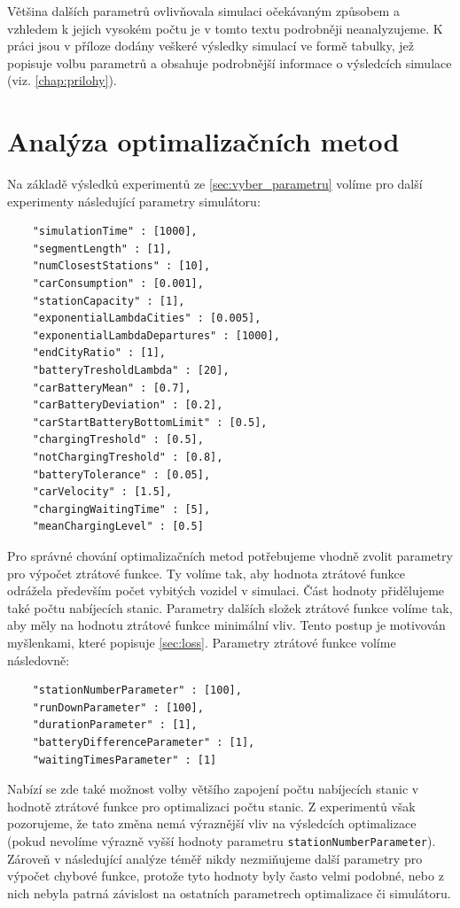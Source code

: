 Většina dalších parametrů ovlivňovala simulaci očekávaným způsobem a vzhledem k jejich vysokém
počtu je v tomto textu podrobněji neanalyzujeme. K práci jsou v příloze dodány veškeré výsledky
simulací ve formě tabulky, jež popisuje volbu parametrů a obsahuje podrobnější informace
o výsledcích simulace (viz. \cref{chap:prilohy}).


\section{Analýza optimalizačních metod}

Na základě výsledků experimentů ze \cref{sec:vyber_parametru} volíme pro další experimenty
následující parametry simulátoru:

\begin{verbatim}
    "simulationTime" : [1000],
    "segmentLength" : [1],
    "numClosestStations" : [10],
    "carConsumption" : [0.001],
    "stationCapacity" : [1],
    "exponentialLambdaCities" : [0.005],
    "exponentialLambdaDepartures" : [1000],
    "endCityRatio" : [1],
    "batteryTresholdLambda" : [20],
    "carBatteryMean" : [0.7],
    "carBatteryDeviation" : [0.2],
    "carStartBatteryBottomLimit" : [0.5],
    "chargingTreshold" : [0.5],
    "notChargingTreshold" : [0.8],
    "batteryTolerance" : [0.05],
    "carVelocity" : [1.5],
    "chargingWaitingTime" : [5],
    "meanChargingLevel" : [0.5]
\end{verbatim}

Pro správné chování optimalizačních metod potřebujeme vhodně zvolit parametry pro 
výpočet ztrátové funkce. Ty volíme tak, aby hodnota ztrátové funkce odrážela 
především počet vybitých vozidel v simulaci. Část hodnoty přidělujeme také
počtu nabíjecích stanic. Parametry dalších složek ztrátové funkce volíme tak, aby
měly na hodnotu ztrátové funkce minimální vliv. Tento postup je motivován
myšlenkami, které popisuje \cref{sec:loss}. Parametry ztrátové funkce volíme
následovně:

\begin{verbatim}
    "stationNumberParameter" : [100],
    "runDownParameter" : [100],
    "durationParameter" : [1],
    "batteryDifferenceParameter" : [1],
    "waitingTimesParameter" : [1]
\end{verbatim}

Nabízí se zde také možnost volby většího zapojení počtu nabíjecích stanic v 
hodnotě ztrátové funkce pro optimalizaci počtu stanic. Z experimentů však
pozorujeme, že tato změna nemá výraznější vliv na výsledcích optimalizace 
(pokud nevolíme výrazně vyšší hodnoty parametru \texttt{stationNumberParameter}).
Zároveň v následující analýze téměř nikdy nezmiňujeme další parametry pro
výpočet chybové funkce, protože tyto hodnoty byly často velmi podobné, nebo
z nich nebyla patrná závislost na ostatních parametrech optimalizace či simulátoru.



